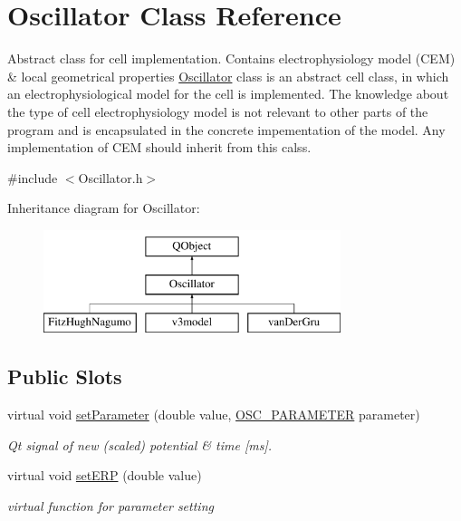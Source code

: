 \hypertarget{class_oscillator}{\section{Oscillator Class Reference}
\label{class_oscillator}
}


Abstract class for cell implementation. Contains electrophysiology model (C\+E\+M) \& local geometrical properties \hyperlink{class_oscillator}{Oscillator} class is an abstract cell class, in which an electrophysiological model for the cell is implemented. The knowledge about the type of cell electrophysiology model is not relevant to other parts of the program and is encapsulated in the concrete impementation of the model. Any implementation of C\+E\+M should inherit from this calss.  




{\ttfamily \#include $<$Oscillator.\+h$>$}

Inheritance diagram for Oscillator\+:\begin{figure}[H]
\begin{center}
\leavevmode
\includegraphics[height=3.000000cm]{class_oscillator}
\end{center}
\end{figure}
\subsection*{Public Slots}
\begin{DoxyCompactItemize}
\item 
virtual void \hyperlink{class_oscillator_a56140e76f42036dc6d7a4cd989917edc}{set\+Parameter} (double value, \hyperlink{heart_defines_8h_a79395aba577c2bc57e7ca211ff3476a6}{O\+S\+C\+\_\+\+P\+A\+R\+A\+M\+E\+T\+E\+R} parameter)
\begin{DoxyCompactList}\small\item\em Qt signal of new (scaled) potential \& time \mbox{[}ms\mbox{]}. \end{DoxyCompactList}\item 
virtual void \hyperlink{class_oscillator_a1c7d55f29268d097fa3bab3f8da3d91a}{set\+E\+R\+P} (double value)
\begin{DoxyCompactList}\small\item\em virtual function for parameter setting \end{DoxyCompactList}\end{DoxyCompactItemize}
